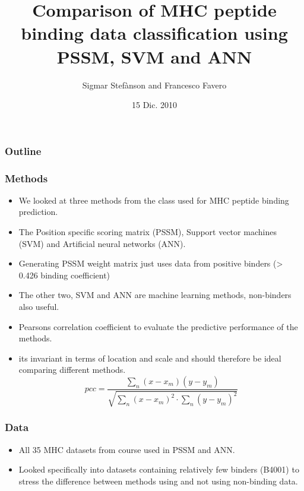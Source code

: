 \documentclass[presentation]{beamer}   %
\begin{document}

\author{Sigmar Stef\`{a}nson and Francesco Favero}
\title[PSSM,ANN,SVM]{Comparison of MHC peptide binding data classification using PSSM, SVM and ANN}
\date{15 Dic. 2010}



\begin{frame}
  \maketitle
\end{frame}

\begin{frame}
  \frametitle{Outline}
  \tableofcontents[currentsection]
\end{frame}

\begin{frame}
  \frametitle{Methods}
  \begin{itemize}
    \item<1> We looked at three methods from the class used for MHC peptide binding prediction.
    \item<2>  The Position specific scoring matrix (PSSM), Support vector machines (SVM) and Artificial neural networks (ANN).
    \item<3> Generating PSSM weight matrix just uses data from positive binders (> 0.426 binding coefficient)
    \item<4> The other two, SVM and ANN are machine learning methods, non-binders also useful.
    \item<5> Pearsons correlation coefficient to evaluate the predictive performance of the methods.
    \item<6> its invariant in terms of location and scale and should therefore be ideal comparing different methods.
	\begin{equation}
		pcc = \frac{ \sum_n{(x-x_m)(y-y_m) } }{ \sqrt{ \sum_n{(x-x_m)^2}\cdot\sum_{n}{(y-y_m)^2} } }
	\end{equation}
  \end{itemize}
\end{frame}

\begin{frame}
  \frametitle{Data}
  \begin{itemize}
    \item<1> All 35 MHC datasets from course used in PSSM and ANN.
    \item<2>  Looked specifically into datasets containing relatively few binders (B4001) to stress the difference between methods using and not using non-binding data.
  \end{itemize}
\end{frame}
\end{document}
